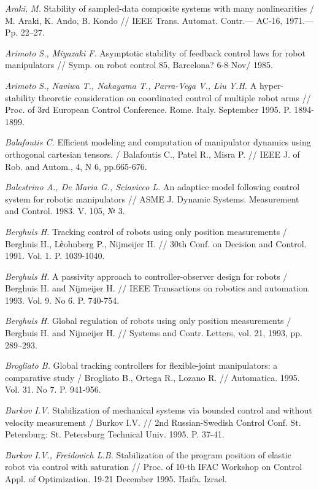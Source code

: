 \begin{thebibliography}{10}
	{\it Araki, M.} Stability of sampled-data composite systems with many nonlinearities / M. Araki, K. Ando, B. Kondo // IEEE Trans. Automat. 		Contr.— AC-16, 1971.— Pp. 22–27.
	
	{\it Arimoto S., Miyazaki F.} Asymptotic stability of feedback control laws for robot manipulators // Symp. on robot control 85, Barcelona? 6-8 Nov/ 1985.

	{\it Arimoto S., Naviwa T., Nakayama T., Parra-Vega V., Liu Y.H.} A hyper-stability theoretic consideration on coordinated control of multiple robot arms // Proc. of 3rd European Control Conference. Rome. Italy. September 1995. P. 1894-1899. 
	
	{\it Balafoutis C.} Efficient modeling and computation of manipulator dynamics using orthogonal cartesian tensors. / Balafoutis C., Patel R., 		Misra P. // IEEE J. of Rob. and Autom., 4, N 6, pp.665-676.
	
	{\it Balestrino A., De Maria G., Sciavicco L.} An adaptice model following control system for robotic manipulators // ASME J. Dynamic Systems. Measurement and Control. 1983. V. 105, № 3.
	
	{\it Berghuis H.} Tracking control of robots using only position measurements / Berghuis H., Lѐohnberg P., Nijmeijer H. // 30th Conf. on 		Decision and Control. 1991. Vol. 1. P. 1039-1040.
	
	{\it Berghuis H.} A passivity approach to controller-observer design for robots / Berghuis H. and Nijmeijer H. // IEEE Transactions on robotics 	and automation. 1993. Vol. 9. No 6. P. 740-754.

	{\it Berghuis H.} Global regulation of robots using only position measurements / Berghuis H. and Nijmeijer H. // Systems and Contr. Letters, 		vol. 21, 1993, pp. 289–293. 
	
	{\it Brogliato B.} Global tracking controllers for flexible-joint manipulators: a comparative study / Brogliato B., Ortega R., Lozano R. // 		Automatica. 1995. Vol. 31. No 7. P. 941-956.
	
	{\it Burkov I.V.} Stabilization of mechanical systems via bounded control and without velocity measurement / Burkov I.V. // 2nd Russian-Swedish 	Control Conf. St. Petersburg: St. Petersburg Technical Univ. 1995. P. 37-41.
	
	{\it Burkov I.V., Freidovich L.B.} Stabilization of the program position of elastic robot via control with saturation // Proc. of 10-th IFAC Workshop on Control Appl. of Optimization. 19-21 December 1995. Haifa. Izrael.
	

\end{thebibliography}

